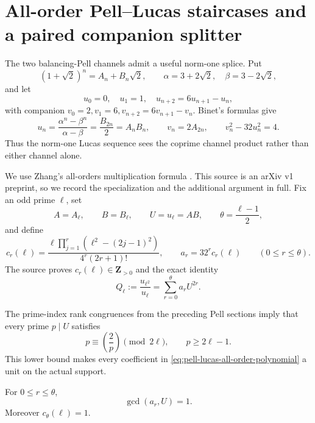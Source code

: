 \section{All-order Pell--Lucas staircases and a paired companion splitter}
\label{sec:pell-lucas-all-order-staircase}

The two balancing-Pell channels admit a useful norm-one splice.  Put
\[
 (1+\sqrt2)^n=A_n+B_n\sqrt2,
 \qquad \alpha=3+2\sqrt2,\quad\beta=3-2\sqrt2,
\]
and let
\[
 u_0=0,\quad u_1=1,\quad u_{n+2}=6u_{n+1}-u_n,
\]
with companion $v_0=2,v_1=6,v_{n+2}=6v_{n+1}-v_n$.  Binet's
formulas give
\begin{equation}\label{eq:pell-lucas-splice}
 u_n=\frac{\alpha^n-\beta^n}{\alpha-\beta}
     =\frac{B_{2n}}2=A_nB_n,
 \qquad v_n=2A_{2n},
 \qquad v_n^2-32u_n^2=4.
\end{equation}
Thus the norm-one Lucas sequence sees the coprime channel product rather
than either channel alone.

We use Zhang's all-orders multiplication formula
\cite[Proposition~5.1]{ZhangLucas2026}.  This source is an arXiv v1
preprint, so we record the specialization and the additional argument in
full.  Fix an odd prime $\ell$, set
\[
 A=A_\ell,\qquad B=B_\ell,\qquad U=u_\ell=AB,
 \qquad \theta=\frac{\ell-1}{2},
\]
and define
\begin{equation}\label{eq:pell-lucas-coefficients}
 c_r(\ell)=
 \frac{\ell\prod_{j=1}^{r}
       (\ell^2-(2j-1)^2)}{4^r(2r+1)!},
 \qquad a_r=32^r c_r(\ell)\qquad(0\le r\le\theta).
\end{equation}
The source proves $c_r(\ell)\in\mathbf Z_{>0}$ and the exact identity
\begin{equation}\label{eq:pell-lucas-all-order-polynomial}
 Q_\ell:=\frac{u_{\ell^2}}{u_\ell}
       =\sum_{r=0}^{\theta}a_rU^{2r}.
\end{equation}

The prime-index rank congruences from the preceding Pell sections imply
that every prime $p\mid U$ satisfies
\begin{equation}\label{eq:pell-lucas-support-lower}
 p\equiv\left(\frac2p\right)\pmod{2\ell},
 \qquad p\ge2\ell-1.
\end{equation}
This lower bound makes every coefficient in
\eqref{eq:pell-lucas-all-order-polynomial} a unit on the actual support.

\begin{lemma}
\label{lem:pell-lucas-coefficient-unit}
For $0\le r\le\theta$,
\[
                         \gcd(a_r,U)=1.
\]
Moreover $c_\theta(\ell)=1$.
\end{lemma}

